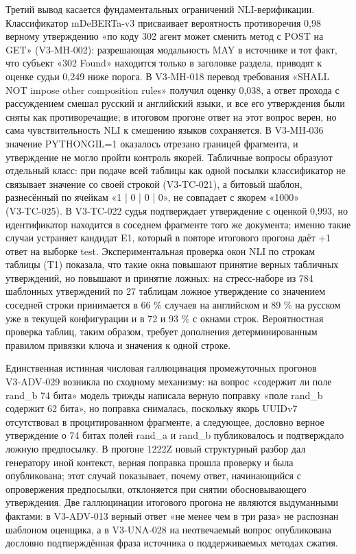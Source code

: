 \documentclass[14pt,a4paper]{extarticle}
\begin{document}
Третий вывод касается фундаментальных ограничений NLI-верификации. Классификатор mDeBERTa-v3 присваивает вероятность противоречия 0,98 верному утверждению «по коду 302 агент может сменить метод с POST на GET» (V3‑MH‑002): разрешающая модальность MAY в источнике и тот факт, что субъект «302 Found» находится только в заголовке раздела, приводят к оценке судьи 0,249 ниже порога. В V3‑MH‑018 перевод требования «SHALL NOT impose other composition rules» получил оценку 0,038, а ответ прохода с рассуждением смешал русский и английский языки, и все его утверждения были сняты как противоречащие; в итоговом прогоне ответ на этот вопрос верен, но сама чувствительность NLI к смешению языков сохраняется. В V3‑MH‑036 значение PYTHONGIL=1 оказалось отрезано границей фрагмента, и утверждение не могло пройти контроль якорей. Табличные вопросы образуют отдельный класс: при подаче всей таблицы как одной посылки классификатор не связывает значение со своей строкой (V3‑TC‑021), а битовый шаблон, разнесённый по ячейкам «1 | 0 | 0 | 0», не совпадает с якорем «1000» (V3‑TC‑025). В V3‑TC‑022 судья подтверждает утверждение с оценкой 0,993, но идентификатор находится в соседнем фрагменте того же документа; именно такие случаи устраняет кандидат E1, который в повторе итогового прогона даёт +1 ответ на выборке test. Экспериментальная проверка окон NLI по строкам таблицы (T1) показала, что такие окна повышают принятие верных табличных утверждений, но повышают и принятие ложных: на стресс-наборе из 784 шаблонных утверждений по 27 таблицам ложное утверждение со значением соседней строки принимается в 66 \% случаев на английском и 89 \% на русском уже в текущей конфигурации и в 72 и 93 \% с окнами строк. Вероятностная проверка таблиц, таким образом, требует дополнения детерминированным правилом привязки ключа и значения к одной строке.

Единственная истинная числовая галлюцинация промежуточных прогонов V3‑ADV‑029 возникла по сходному механизму: на вопрос «содержит ли поле rand\_b 74 бита» модель трижды написала верную поправку «поле rand\_b содержит 62 бита», но поправка снималась, поскольку якорь UUIDv7 отсутствовал в процитированном фрагменте, а следующее, дословно верное утверждение о 74 битах полей rand\_a и rand\_b публиковалось и подтверждало ложную предпосылку. В прогоне 1222Z новый структурный разбор дал генератору иной контекст, верная поправка прошла проверку и была опубликована; этот случай показывает, почему ответ, начинающийся с опровержения предпосылки, отклоняется при снятии обосновывающего утверждения. Две галлюцинации итогового прогона не являются выдуманными фактами: в V3‑ADV‑013 верный ответ «не менее чем в три раза» не распознан шаблоном оценщика, а в V3‑UNA‑028 на неотвечаемый вопрос опубликована дословно подтверждённая фраза источника о поддерживаемых методах сжатия.
\end{document}
